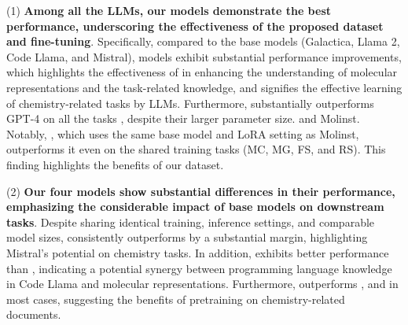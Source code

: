 (1) \textbf{Among all the LLMs, our \modelname models demonstrate the best performance, underscoring the effectiveness of the proposed \datasetname dataset and fine-tuning}.
Specifically, compared to the base models (Galactica, Llama 2, Code Llama, and Mistral), \modelname models exhibit substantial performance improvements, which highlights the effectiveness of \datasetname in enhancing the understanding of molecular representations and the task-related knowledge, and signifies the effective learning of chemistry-related tasks by LLMs.
Furthermore, \modelname substantially outperforms GPT-4 on all the tasks , despite their larger parameter size.
 and Molinst.
Notably, \modelnamel, which uses the same base model and LoRA setting as Molinst, outperforms it even on the shared training tasks (MC, MG, FS, and RS). This finding highlights the benefits of our dataset.

(2) \textbf{Our four \modelname models show substantial differences in their performance, emphasizing the considerable impact of base models on downstream tasks}. 
Despite sharing identical training, inference settings, and comparable model sizes, \modelnamem consistently outperforms \modelnamel by a substantial margin, highlighting Mistral's potential on chemistry tasks.
In addition, \modelnamec exhibits better performance than \modelnamel {}, indicating a potential synergy between programming language knowledge in Code Llama and molecular representations.
Furthermore, \modelnameg outperforms \modelnamel, and \modelnamec in most cases, suggesting the benefits of pretraining on chemistry-related documents.


